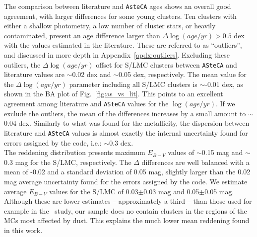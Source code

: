 \documentclass[draft]{aa}
\begin{document}
The comparison between literature and \texttt{AsteCA} ages shows an overall good
agreement, with larger differences for some young clusters. Ten clusters with
either a shallow photometry, a low number of cluster stars, or heavily
contaminated, present an age difference larger than $\Delta \log(age/yr){>}0.5$
dex with the values estimated in the literature.
These are referred to as ``outliers'', and discussed in more depth in
Appendix~\ref{apdx:outliers}.
%
%
Excluding these outliers, the $\Delta \log(age/yr)$ offset for S/LMC clusters
between \texttt{ASteCA} and literature values are $\sim$0.02 dex and $\sim$0.05
dex, respectively.
The mean value for the $\Delta \log(age/yr)$ parameter including all S/LMC
clusters is $\sim$-0.01 dex, as shown in the BA plot of
Fig.~\ref{fig:as_vs_lit}. This points to an excellent agreement among
literature and \texttt{ASteCA} values for the $\log(age/yr)$.
If we exclude the outliers, the mean of the differences increases by a small
amount to $\sim$0.04 dex.
Similarly to what was found for the metallicity, the dispersion between
literature and \texttt{ASteCA} values is almost exactly the internal uncertainty
found for errors assigned by the code, i.e.: $\sim$0.3 dex.\\

The reddening distribution presents maximum $E_{B-V}$ values of $\sim$0.15
mag and $\sim$0.3 mag for the S/LMC, respectively.
The $\Delta$ differences are well balanced with a mean of -0.02 and a
standard deviation of 0.05 mag, slightly larger than the 0.02 mag average
uncertainty found for the errors assigned by the code. We estimate average
$E_{B-V}$ values for the S/LMC of 0.03$\pm$0.03 mag and 0.05$\pm$0.05 mag.
Although these are lower estimates -- approximately a third -- than those used
for example in the~\cite{Hunter_2003} study, our sample does no contain clusters
in the regions of the MCs most affected by dust. This explains the much lower
mean reddening found in this work.\\
\end{document}
